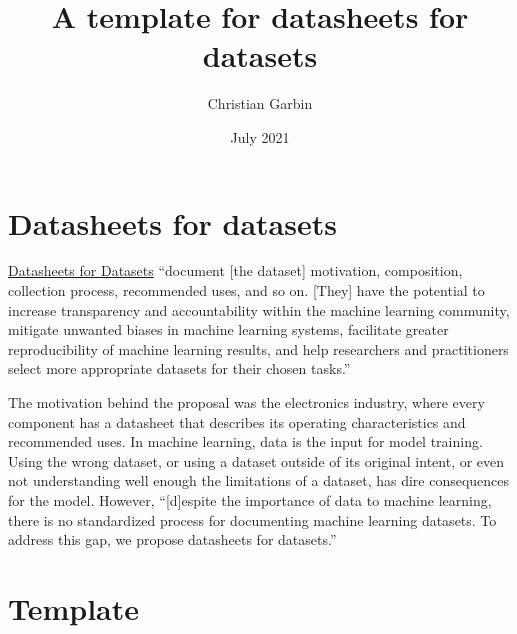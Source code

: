 \documentclass{article}
\title{A template for datasheets for datasets}
\author{Christian Garbin}
\date{July 2021}
\begin{document}
\maketitle

\section{Datasheets for datasets}

\href{https://arxiv.org/abs/1803.09010}{Datasheets for Datasets} ``document [the dataset] motivation, composition, collection process, recommended uses, and so on. [They] have the potential to increase transparency and accountability within the machine learning community, mitigate unwanted biases in machine learning systems, facilitate greater reproducibility of machine learning results, and help researchers and practitioners select more appropriate datasets for their chosen tasks.''

The motivation behind the proposal was the electronics industry, where every component has a datasheet that describes its operating characteristics and recommended uses. In machine learning, data is the input for model training. Using the wrong dataset, or using a dataset outside of its original intent, or even not understanding well enough the limitations of a dataset, has dire consequences for the model. However, ``[d]espite the importance of data to machine learning, there is no standardized process for documenting machine learning datasets. To address this gap, we propose datasheets for datasets.''

\section{Template}


\newcommand{\dssectionheader}[1]{%
   \noindent\framebox[\columnwidth]{%
      {\fontfamily{phv}\selectfont \textbf{\textcolor{darkblue}{#1}}}
   }
}

\newcommand{\dsquestion}[1]{%
    {\noindent \fontfamily{phv}\selectfont \textcolor{darkblue}{\textbf{#1}}}
}

\newcommand{\dsquestionex}[2]{%
    {\noindent \fontfamily{phv}\selectfont \textcolor{darkblue}{\textbf{#1} #2}}
}

\newcommand{\dsanswer}[1]{%
   {\noindent #1 \medskip}
}
\end{document}
